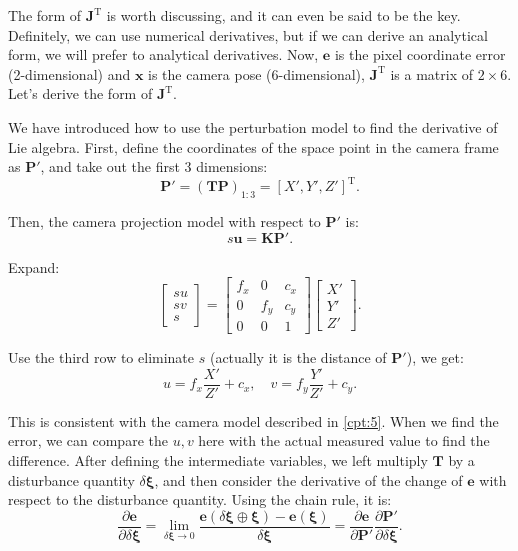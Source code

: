 The form of $\bm{J}^\mathrm{T}$ is worth discussing, and it can even be said to be the key. Definitely, we can use numerical derivatives, but if we can derive an analytical form, we will prefer to analytical derivatives. Now, $\bm{e}$ is the pixel coordinate error (2-dimensional) and $\bm{x}$ is the camera pose (6-dimensional), $\bm{J}^\mathrm{T}$ is a matrix of $2 \times 6$. Let's derive the form of $\bm{J}^\mathrm{T}$.

We have introduced how to use the perturbation model to find the derivative of Lie algebra. First, define the coordinates of the space point in the camera frame as $\bm{P}'$, and take out the first 3 dimensions:
\begin{equation}
\bm{P}' = \left( \bm{T}{\bm{P}} \right)_{1:3}= [X', Y', Z']^\mathrm{T}.
\end{equation}

Then, the camera projection model with respect to $\bm{P}'$ is:
\begin{equation}
s {\bm{u}} = \bm{K} \bm{P}'.
\end{equation}

Expand:
\begin{equation}
\left[ \begin{array}{l}
su\\
sv\\
s
\end{array} \right] = \left[ {\begin{array}{*{20}{c}}
	{{f_x}}&0&{{c_x}}\\
	0&{{f_y}}&{{c_y}}\\
	0&0&1
	\end{array}} \right]\left[ \begin{array}{l}
X'\\
Y'\\
Z'
\end{array} \right].
\end{equation}

Use the third row to eliminate $s$ (actually it is the distance of $\bm{P}'$), we get:
\begin{equation}
\label{eq:uv2xyz}
u = {f_x}\frac{{X'}}{{Z'}} + {c_x}, \quad v = {f_y}\frac{{Y'}}{{Z'}} + {c_y}.
\end{equation}

This is consistent with the camera model described in \ref{cpt:5}. When we find the error, we can compare the $u, v$ here with the actual measured value to find the difference. After defining the intermediate variables, we left multiply $\bm{T}$ by a disturbance quantity $\delta \boldsymbol{\xi}$, and then consider the derivative of the change of $\bm{e}$ with respect to the disturbance quantity. Using the chain rule, it is:
\begin{equation}
\frac{{\partial \bm{e}}}{{\partial \delta \boldsymbol{\xi} }} = \mathop {\lim }\limits_{\delta \boldsymbol{\xi}  \to 0} \frac{{\bm{e}\left( {\delta \boldsymbol{\xi}  \oplus \boldsymbol{\xi} } \right)-\bm{e}(\boldsymbol{\xi})}}{{\delta \boldsymbol{\xi} }}  = \frac{{\partial \bm{e}}}{{\partial \bm{P}'}}\frac{{\partial \bm{P}'}}{{\partial \delta \boldsymbol{\xi} }}.
\end{equation}

